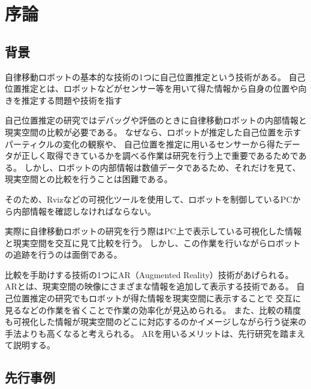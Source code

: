 \chapter{序論}

\section{背景}
自律移動ロボットの基本的な技術の1つに自己位置推定という技術がある。
自己位置推定とは、ロボットなどがセンサー等を用いて得た情報から自身の位置や向きを推定する問題や技術を指す

自己位置推定の研究ではデバッグや評価のときに自律移動ロボットの内部情報と現実空間の比較が必要である。
なぜなら、ロボットが推定した自己位置を示すパーティクルの変化の観察や、
自己位置を推定に用いるセンサーから得たデータが正しく取得できているかを調べる作業は研究を行う上で重要であるためである。
しかし、ロボットの内部情報は数値データであるため、それだけを見て、現実空間との比較を行うことは困難である。

そのため、Rvizなどの可視化ツールを使用して、ロボットを制御しているPCから内部情報を確認しなければならない。


実際に自律移動ロボットの研究を行う際はPC上で表示している可視化した情報と現実空間を交互に見て比較を行う。
しかし、この作業を行いながらロボットの追跡を行うのは面倒である。

比較を手助けする技術の1つにAR（Augmented Reality）技術があげられる。
ARとは、現実空間の映像にさまざまな情報を追加して表示する技術である。
自己位置推定の研究でもロボットが得た情報を現実空間に表示することで
交互に見るなどの作業を省くことで作業の効率化が見込められる。
また、比較の精度も可視化した情報が現実空間のどこに対応するのかイメージしながら行う従来の手法よりも高くなると考えられる。
ARを用いるメリットは、先行研究を踏まえて説明する。

\section{先行事例}

